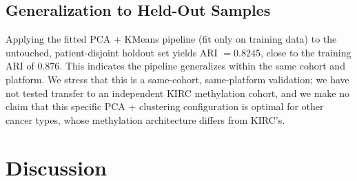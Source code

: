 \documentclass[sigconf]{acmart}
\begin{document}
\begin{table}[t]
\caption{Label-free internal metrics vs.\ ARI (training set). Best value per column in bold; silhouette higher is better, DB lower is better.}
\label{tab:labelfree}
\end{table}

\subsection{Generalization to Held-Out Samples}
\label{sec:generalization}
Applying the fitted PCA + KMeans pipeline (fit only on training data) to the untouched, patient-disjoint holdout set yields ARI $=0.8245$, close to the training ARI of $0.876$. This indicates the pipeline generalizes within the same cohort and platform. We stress that this is a same-cohort, same-platform validation; we have not tested transfer to an independent KIRC methylation cohort, and we make no claim that this specific PCA + clustering configuration is optimal for other cancer types, whose methylation architecture differs from KIRC's.

\section{Discussion}
\end{document}
